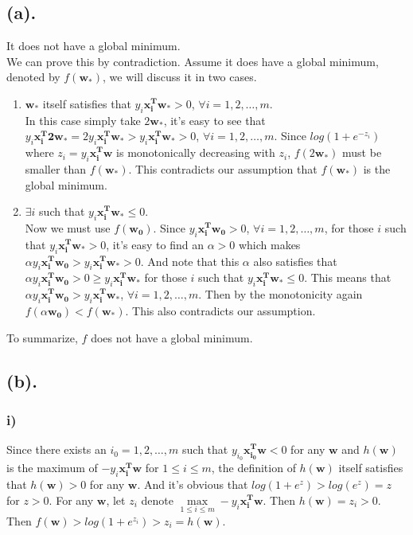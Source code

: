 \documentclass[12pt,letterpaper]{article}
\begin{document}
\subsection*{(a).}
It does not have a global minimum.\\
We can prove this by contradiction. Assume it does have a global minimum, denoted by $f(\boldsymbol{w_{*}})$, we will discuss it in two cases.
\begin{enumerate}
    \item $\boldsymbol{w_{*}}$ itself satisfies that $y_{i}\boldsymbol{x_{i}^{T}w_{*}}>0$, $ \forall i=1,2,\dots,m$.\\
    In this case simply take $2\boldsymbol{w_{*}}$, it's easy to see that $y_{i}\boldsymbol{x_{i}^{T}2w_{*}}=2y_{i}\boldsymbol{x_{i}^{T}w_{*}}>y_{i}\boldsymbol{x_{i}^{T}w_{*}}>0$, $ \forall i=1,2,\dots,m$. Since $log(1+e^{-z_{i}})$ where $z_{i}=y_{i}\boldsymbol{x_{i}^{T}w}$ is monotonically decreasing with $z_{i}$, $f(2\boldsymbol{w_{*}})$ must be smaller than $f(\boldsymbol{w_{*}})$. This contradicts our assumption that $f(\boldsymbol{w_{*}})$ is the global minimum.
    \item $\exists i$ such that $y_{i}\boldsymbol{x_{i}^{T}w_{*}}\leq0$.\\
    Now we must use $f(\boldsymbol{w_{0}})$. Since $y_{i}\boldsymbol{x_{i}^{T}w_{0}}>0$, $ \forall i=1,2,\dots,m$, for those $i$ such that $y_{i}\boldsymbol{x_{i}^{T}w_{*}}>0$, it's easy to find an $\alpha>0$ which makes $\alpha y_{i}\boldsymbol{x_{i}^{T}w_{0}}>y_{i}\boldsymbol{x_{i}^{T}w_{*}}>0$. And note that this $\alpha$ also satisfies that $\alpha y_{i}\boldsymbol{x_{i}^{T}w_{0}}>0\geq y_{i}\boldsymbol{x_{i}^{T}w_{*}}$ for those $i$ such that $y_{i}\boldsymbol{x_{i}^{T}w_{*}}\leq0$. This means that $\alpha y_{i}\boldsymbol{x_{i}^{T}w_{0}}>y_{i}\boldsymbol{x_{i}^{T}w_{*}}$, $ \forall i=1,2,\dots,m$. Then by the monotonicity again $f(\alpha\boldsymbol{w_{0}})<f(\boldsymbol{w}_{*})$. This also contradicts our assumption.
\end{enumerate}
To summarize, $f$ does not have a global minimum.
\subsection*{(b).}
\subsubsection*{i)}
Since there exists an $i_{0}=1,2,\dots,m$ such that $y_{i_{0}}\boldsymbol{x_{i_{0}}^{T}w}<0$ for any $\boldsymbol{w}$ and $h(\boldsymbol{w})$ is the maximum of $-y_{i}\boldsymbol{x_{i}^{T}w}$ for $1\leq i\leq m$, the definition of $h
(\boldsymbol{w})$ itself satisfies that $h(\boldsymbol{w})>0$ for any $\boldsymbol{w}$. And it's obvious that $log(1+e^{z})>log(e^{z})=z$ for $z>0$. For any $\boldsymbol{w}$, let $z_{i}$ denote $\max \limits_{1\leq i\leq m}-y_{i}\boldsymbol{x_{i}^{T}w}$. Then $h(\boldsymbol{w})=z_{i}>0$. Then $f(\boldsymbol{w})>log(1+e^{z_{i}})>z_{i}=h(\boldsymbol{w})$. 
\end{document}
